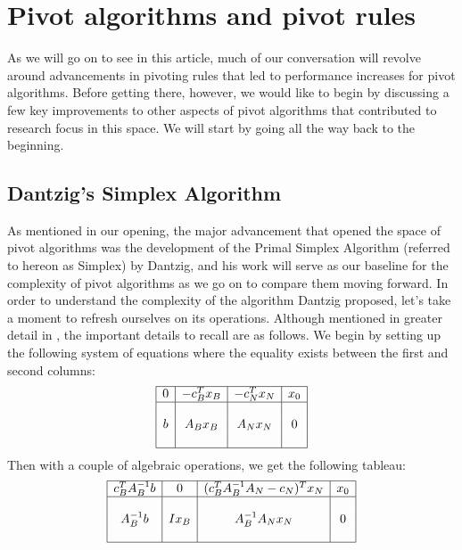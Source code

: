 \documentclass[11pt]{article}
\begin{document}
\section{Pivot algorithms and pivot rules}
As we will go on to see in this article, much of our conversation will revolve around advancements in pivoting rules that led to performance increases for pivot algorithms. Before getting there, however, we would like to begin by discussing a few key improvements to other aspects of pivot algorithms that contributed to research focus in this space. We will start by going all the way back to the beginning.

\subsection{Dantzig's Simplex Algorithm}
As mentioned in our opening, the major advancement that opened the space of pivot algorithms was the development of the Primal Simplex Algorithm (referred to hereon as Simplex) by Dantzig, and his work will serve as our baseline for the complexity of pivot algorithms as we go on to compare them moving forward. In order to understand the complexity of the algorithm Dantzig proposed, let's take a moment to refresh ourselves on its operations. Although mentioned in greater detail in \cite{dantzig1951maximization}, the important details to recall are as follows. We begin by setting up the following system of equations where the equality exists between the first and second columns:
\[\begin{array}{|c|c|c|c|}
	\hline
	0 & -c_B^T x_B & -c_N^T x_N & x_0 \\
	\hline
	&&&\\
	b & A_B x_B & A_N x_N & 0 \\
	&&&\\
	\hline
\end{array}\]
Then with a couple of algebraic operations, we get the following tableau:
\[\begin{array}{|c|c|c|c|}
	\hline
	c_B^T A_B^{-1} b & 0 & (c_B^T A_B^{-1} A_N -c_N)^T x_N & x_0 \\
	\hline
	&&&\\
	A_B^{-1}b & Ix_B & A_B^{-1}A_N x_N & 0 \\
	&&&\\
	\hline
\end{array}\]
\end{document}

